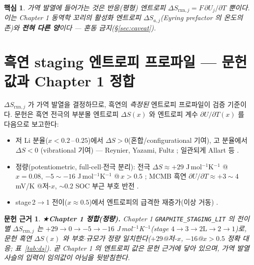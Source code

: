 \documentclass[11pt,a4paper]{article}
\newtheorem*{keybox}{핵심}
\newtheorem*{srcbox}{문헌 근거}
\newcommand{\rxn}{\mathrm{rxn}}
\begin{document}
\begin{keybox}
가역 발열에 들어가는 것은 \emph{반응(평형) 엔트로피} $\Delta S_{\rxn,j}=F\,\partial U_j/\partial T$ 뿐이다.
이는 Chapter 1 동역학 꼬리의 \emph{활성화 엔트로피} $\Delta S_{a,j}$(Eyring prefactor 의 온도의존)와
\textbf{전혀 다른 양}이다 — 혼동 금지(\S\ref{sec:caveat}).
\end{keybox}

\section{흑연 staging 엔트로피 프로파일 — 문헌값과 Chapter 1 정합}\label{sec:profile}
$\Delta S_{\rxn,j}$ 가 가역 발열을 결정하므로, 흑연의 \emph{측정된} 엔트로피 프로파일이 검증 기준이다.
문헌은 흑연 전극의 부분몰 엔트로피 $\Delta S(x)$ 와 엔트로피 계수 $\partial U/\partial T(x)$ 를 다음으로
보고한다:
\begin{itemize}[leftmargin=1.4em,itemsep=2pt]
\item 저 Li 분율($x<0.2$\,–\,$0.25$)에서 $\Delta S>0$(혼합/configurational 기여), 고 분율에서 $\Delta S<0$
(vibrational 기여) — Reynier, Yazami, Fultz \cite{reynier2003}; 일관되게 Allart 등 \cite{allart2018}.
\item 정량(potentiometric, full-cell$\cdot$전극 분리): 전극 $\Delta S\approx +29$ J\,mol$^{-1}$K$^{-1}$
@\,$x=0.08$, $-5\sim-16$ J\,mol$^{-1}$K$^{-1}$ @\,$x>0.5$ \cite{allart2018}; MCMB 흑연 $\partial U/\partial T
\approx+3\sim4$ mV/K @저-$x$, $\sim0.2$ SOC 부근 부호 반전 \cite{msmr_partII}.
\item stage\,2$\to$1 전이($x\approx0.5$)에서 엔트로피의 급격한 재증가(이상 거동) \cite{reynier2003,allart2018}.
\end{itemize}

\begin{srcbox}
★\textbf{Chapter 1 정합(정량).} Chapter 1 \texttt{GRAPHITE\_STAGING\_LIT} 의 전이별 $\Delta S_{\rxn,j}$ 는
$+29\to0\to-5\to-16$ J\,mol$^{-1}$K$^{-1}$(stage $4\!\to\!3\!\to\!2\mathrm L\!\to\!2\!\to\!1$)로, 문헌 흑연
$\Delta S(x)$ \cite{allart2018} 와 \emph{부호$\cdot$규모가 정량 일치}한다($+29$@저-$x$, $-16$@$x>0.5$ 정확
대응; 표~\ref{tab:ds}). 곧 Chapter 1 의 엔트로피 값은 문헌 근거에 닿아 있으며, 가역 발열 사슬의 입력이
임의값이 아님을 뒷받침한다.
\end{srcbox}
\end{document}
